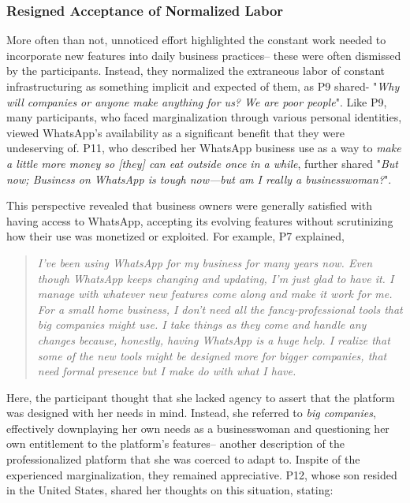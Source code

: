 \subsubsection{Resigned Acceptance of Normalized Labor}


More often than not, unnoticed effort highlighted the constant work needed to incorporate new features into daily business practices-- these were often dismissed by the participants. Instead, they normalized the extraneous labor of constant infrastructuring as something implicit and expected of them, as P9 shared- "\textit{Why will companies or anyone make anything for us? We are poor people}". Like P9, many participants, who faced marginalization through various personal identities, viewed WhatsApp’s availability as a significant benefit that they were undeserving of. P11, who described her WhatsApp business use as a way to \textit{make a little more money so [they] can eat outside once in a while}, further shared "\textit{But now; Business on WhatsApp is tough now—but am I really a businesswoman?}".

This perspective revealed that business owners were generally satisfied with having access to WhatsApp, accepting its evolving features without scrutinizing how their use was monetized or exploited. For example, P7 explained,


\begin{quote}
\textit{I've been using WhatsApp for my business for many years now. Even though WhatsApp keeps changing and updating, I'm just glad to have it. I manage with whatever new features come along and make it work for me. For a small home business, I don't need all the fancy-professional tools that big companies might use. I take things as they come and handle any changes because, honestly, having WhatsApp is a huge help. I realize that some of the new tools might be designed more for bigger companies, that need formal presence but I make do with what I have.}
\end{quote}


Here, the participant thought that she lacked agency to assert that the platform was designed with her needs in mind. Instead, she referred to \textit{big companies}, effectively downplaying her own needs as a businesswoman and questioning her own entitlement to the platform's features-- another description of the professionalized platform that she was coerced to adapt to. Inspite of the experienced marginalization, they remained appreciative. P12, whose son resided in the United States, shared her thoughts on this situation, stating:

